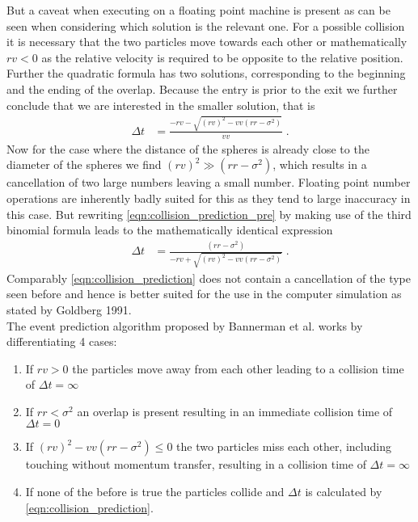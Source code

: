 But a caveat when executing on a floating point machine is present as can be seen when considering which solution is the relevant one. For a possible collision it is necessary that the two particles move towards each other or mathematically $rv<0$ as the relative velocity is required to be opposite to the relative position.\\

Further the quadratic formula has two solutions, corresponding to the beginning and the ending of the overlap. Because the entry is prior to the exit we further conclude that we are interested in the smaller solution, that is
\begin{align}
\label{eqn:collision_prediction_pre}
\Delta t &= \frac{ - rv - \sqrt{ (rv)^2  - vv (rr - \sigma^2 )} }{vv} \; \text{.}
\end{align}
Now for the case where the distance of the spheres is already close to the diameter of the spheres we find $(rv)^2 \gg (rr-\sigma^2)$, which results in a cancellation of two large numbers leaving a small number. Floating point number operations are inherently badly suited for this as they tend to large inaccuracy in this case. But rewriting \autoref{eqn:collision_prediction_pre} by making use of the third binomial formula leads to the mathematically identical expression
\begin{align}
\label{eqn:collision_prediction}
\Delta t &= \frac{(rr - \sigma^2 )}{ - rv + \sqrt{ (rv)^2  - vv (rr - \sigma^2 )}} \; \text{.}
\end{align}
Comparably \autoref{eqn:collision_prediction} does not contain a cancellation of the type seen before and hence is better suited for the use in the computer simulation as stated by Goldberg 1991\cite{Goldberg1991}.\\

The event prediction algorithm proposed by Bannerman et al.\cite{Bannerman2014} works by differentiating 4 cases:
\begin{enumerate}
\item If $rv>0$ the particles move away from each other leading to a collision time of $\Delta t = \infty$
\item If $rr<\sigma^2$ an overlap is present resulting in an immediate collision time of $\Delta t = 0$
\item If $(rv)^2  - vv (rr - \sigma^2 ) \leq 0 $ the two particles miss each other, including touching without momentum transfer, resulting in a collision time of $\Delta t = \infty$
\item If none of the before is true the particles collide and $\Delta t$ is calculated by \autoref{eqn:collision_prediction}.
\end{enumerate}

